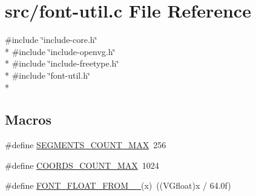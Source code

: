 \hypertarget{font-util_8c}{}\section{src/font-\/util.c File Reference}
\label{font-util_8c}
{\ttfamily \#include \char`\"{}include-\/core.\+h\char`\"{}}\\*
{\ttfamily \#include \char`\"{}include-\/openvg.\+h\char`\"{}}\\*
{\ttfamily \#include \char`\"{}include-\/freetype.\+h\char`\"{}}\\*
{\ttfamily \#include \char`\"{}font-\/util.\+h\char`\"{}}\\*
\subsection*{Macros}
\begin{DoxyCompactItemize}
\item 
\#define \hyperlink{font-util_8c_a8bf9a10d3231b69eaffed4017b90aa8a}{S\+E\+G\+M\+E\+N\+T\+S\+\_\+\+C\+O\+U\+N\+T\+\_\+\+M\+A\+X}~256
\item 
\#define \hyperlink{font-util_8c_a3328f7792ae2c0722a0ad16bce879029}{C\+O\+O\+R\+D\+S\+\_\+\+C\+O\+U\+N\+T\+\_\+\+M\+A\+X}~1024
\item 
\#define \hyperlink{font-util_8c_a879da8d8ac74b55e73b8725d4161fdc5}{F\+O\+N\+T\+\_\+\+F\+L\+O\+A\+T\+\_\+\+F\+R\+O\+M\+\_\+\_}(x)~((V\+Gfloat)x / 64.\+0f)
\end{DoxyCompactItemize}
